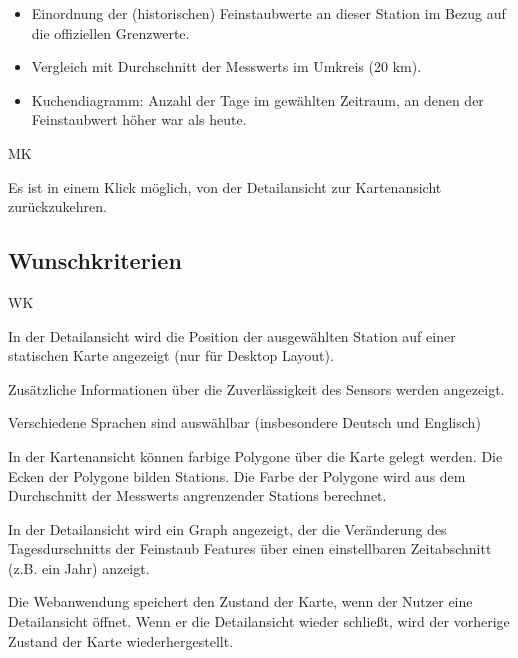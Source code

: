 \begin{itemize}
	\item Einordnung der (historischen) Feinstaubwerte an dieser \gls{Station} im Bezug auf die offiziellen Grenzwerte.
    \item Vergleich mit Durchschnitt der \glspl{Messwert} im Umkreis (20 km).
    \item \gls{Kuchendiagramm}: Anzahl der Tage im gewählten Zeitraum, an denen der Feinstaubwert höher war als heute.
\end{itemize}

\begin{Kriterien}{MK}	

	\item Es ist in einem Klick möglich, von der \gls{Detailansicht} zur \gls{Kartenansicht} zurückzukehren.

\end{Kriterien}

\newpage
\subsection{Wunschkriterien}
\setcounter{counter}{10}
\begin{Kriterien}{WK}

	\item In der \gls{Detailansicht} wird die Position der ausgewählten \gls{Station} auf einer statischen Karte angezeigt 
	(nur für Desktop Layout). 

	\item Zusätzliche Informationen über die Zuverlässigkeit des Sensors werden angezeigt.

	\item Verschiedene Sprachen sind auswählbar (insbesondere Deutsch und Englisch)
	
	\item In der \gls{Kartenansicht} können farbige Polygone über die Karte gelegt werden. Die Ecken der Polygone bilden 
	\glspl{Station}. Die Farbe der Polygone wird aus dem Durchschnitt der \glspl{Messwert} angrenzender \glspl{Station} berechnet.
	
	\item In der \gls{Detailansicht} wird ein \gls{Graph} angezeigt, der die Veränderung des Tagesdurschnitts der Feinstaub 
	\glspl{Feature} über einen einstellbaren Zeitabschnitt (z.B. ein Jahr) anzeigt.
	
	\item Die Webanwendung speichert den Zustand der Karte, wenn der Nutzer eine \gls{Detailansicht} öffnet. Wenn er die 
	\gls{Detailansicht} wieder schließt, wird der vorherige Zustand der Karte wiederhergestellt.

\end{Kriterien}

